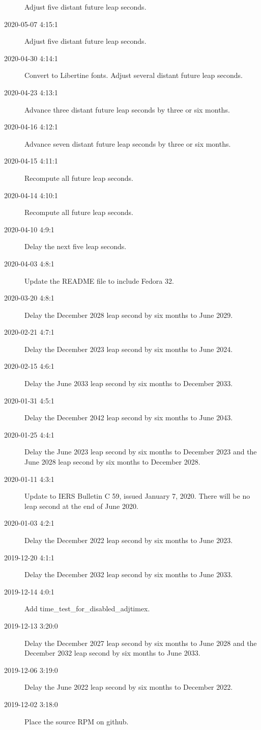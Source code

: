 \documentclass[letterpaper,twoside]{article}
\begin{document}
\begin{description}
  Adjust five distant future leap seconds.
\item[2020-05-07 4:15:1]Adjust five distant future leap seconds.
\item[2020-04-30 4:14:1]Convert to Libertine fonts.  Adjust several distant
  future leap seconds.
\item[2020-04-23 4:13:1]Advance three distant future leap seconds
  by three or six months.
\item[2020-04-16 4:12:1]Advance seven distant future leap seconds
  by three or six months.
\item[2020-04-15 4:11:1]Recompute all future leap seconds.
\item[2020-04-14 4:10:1]Recompute all future leap seconds.
\item[2020-04-10 4:9:1]Delay the next five leap seconds.
\item[2020-04-03 4:8:1]Update the README file to include Fedora 32.
\item[2020-03-20 4:8:1]Delay the December 2028 leap second by six months
  to June 2029.
\item[2020-02-21 4:7:1]Delay the December 2023 leap second by six months
  to June 2024.
\item[2020-02-15 4:6:1]Delay the June 2033 leap second by six months
  to December 2033.
\item[2020-01-31 4:5:1]Delay the December 2042 leap second by six months
  to June 2043.
\item[2020-01-25 4:4:1]Delay the June 2023 leap second by six months
  to December 2023 and the June 2028 leap second by six months to December
  2028.
\item[2020-01-11 4:3:1]Update to IERS Bulletin C 59, issued January 7, 2020.
  There will be no leap second at the end of June 2020.
\item[2020-01-03 4:2:1]Delay the December 2022 leap second by six months
  to June 2023.
\item[2019-12-20 4:1:1]Delay the December 2032 leap second by six months
  to June 2033.
\item[2019-12-14 4:0:1]Add {\ttfamily time\_test\_for\_disabled\_adjtimex}.
\item[2019-12-13 3:20:0]Delay the December 2027 leap second by six months
  to June 2028 and the December 2032 leap second by six months to June 2033.
\item[2019-12-06 3:19:0]Delay the June 2022 leap second by six months
  to December 2022.
\item[2019-12-02 3:18:0]Place the source RPM on github.

\end{description}
\end{document}
